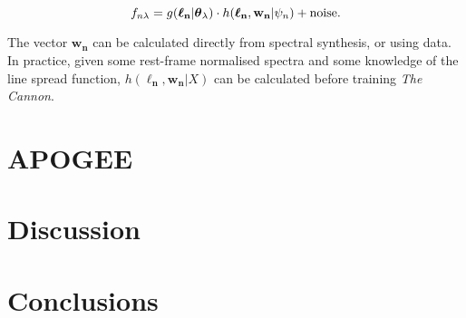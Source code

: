 \documentclass[useAMS,usenatbib]{mn2e}
\newcommand\tc{\textit{The Cannon}}
\newcommand\lv{\mathbf{\boldsymbol\ell_n}}
\newcommand\cv{{\boldsymbol\theta}_\lambda}
\newcommand\wv{\mathbf{w_n}}
\newcommand\given{|}
\begin{document}
\begin{equation}
    f_{n\lambda} = g(\lv\given\cv) \cdot h(\lv,\wv\given\psi_n) +  {\rm noise}.
\end{equation}

The vector $\wv$ can be calculated directly from spectral synthesis, or using data.
In practice, given some rest-frame normalised spectra and some knowledge of the
line spread function, $h(\lv,\wv\given{}X)$ can be calculated before training \tc.







\section{APOGEE}





\section{Discussion}





\section{Conclusions}
\end{document}
